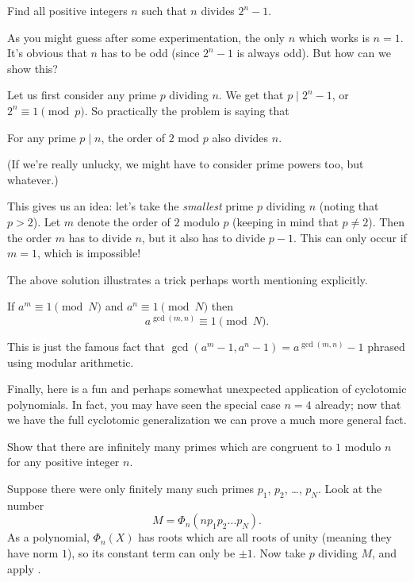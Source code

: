 \documentclass[11pt]{scrartcl}
\begin{document}
\begin{example}[Folklore]
  Find all positive integers $n$ such that $n$ divides $2^n-1$.
\end{example}
\begin{soln}
  As you might guess after some experimentation, the only $n$ which works is $n=1$.
  It's obvious that $n$ has to be odd (since $2^n-1$ is always odd).
  But how can we show this?

  Let us first consider any prime $p$ dividing $n$.
  We get that $p \mid 2^n-1$, or $2^n \equiv 1 \pmod p$.
  So practically the problem is saying that
  \begin{center}
    For any prime $p \mid n$, the order of $2$ mod $p$ also divides $n$.
  \end{center}
  (If we're really unlucky, we might have to consider prime powers too, but whatever.)

  This gives us an idea: let's take the \emph{smallest} prime $p$ dividing $n$ (noting that $p>2$).
  Let $m$ denote the order of $2$ modulo $p$ (keeping in mind that $p \neq 2$).
  Then the order $m$ has to divide $n$, but it also has to divide $p-1$.
  This can only occur if $m=1$, which is impossible!
\end{soln}
The above solution illustrates a trick perhaps worth mentioning explicitly.
\begin{lemma}
  If $a^m \equiv 1 \pmod N$ and $a^n \equiv 1 \pmod N$
  then \[ a^{\gcd(m,n)} \equiv 1 \pmod N. \]
\end{lemma}
This is just the famous fact that $\gcd(a^m-1,a^n-1)=a^{\gcd(m,n)}-1$
phrased using modular arithmetic.

Finally, here is a fun and perhaps somewhat unexpected application of cyclotomic polynomials.
In fact, you may have seen the special case $n=4$ already;
now that we have the full cyclotomic generalization we can prove a much more general fact.
\begin{example}
  Show that there are infinitely many primes which are congruent to $1$ modulo
  $n$ for any positive integer $n$.
\end{example}
\begin{soln}
  Suppose there were only finitely many such primes $p_1$, $p_2$, \dots, $p_N$.
  Look at the number
  \[ M = \Phi_n(np_1p_2 \dots p_N). \]
  As a polynomial, $\Phi_n(X)$ has roots which are all roots of unity (meaning they have norm $1$),
  so its constant term can only be $\pm 1$.
  Now take $p$ dividing $M$, and apply .
\end{soln}
\end{document}
